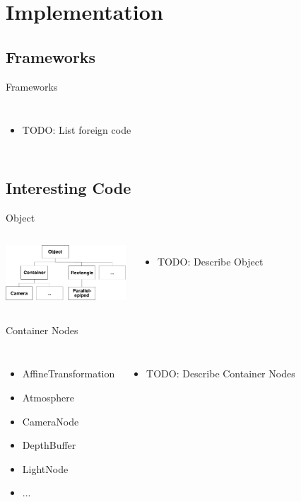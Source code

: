 \documentclass[12pt,ucs,hyperref={pdftext}]{beamer}
\newlength{\columnleft}
\newlength{\columnright}
\begin{document}
\section{Implementation}


\subsection{Frameworks}

\begin{frame}{Frameworks}
\begin{columns}

\column{\columnleft}

\column{\columnright}
\begin{itemize}%
\item TODO: List foreign code
\end{itemize}

\end{columns}
\end{frame}


\subsection{Interesting Code}

\begin{frame}{Object}
\begin{columns}

\column{\columnleft}
\includegraphics[width=4.5cm]{media/object.pdf}

\column{\columnright}
\begin{itemize}%
\item TODO: Describe Object
\end{itemize}

\end{columns}
\end{frame}

\begin{frame}{Container Nodes}
\begin{columns}

\column{\columnleft}
\begin{itemize}
\item AffineTransformation
\item Atmosphere
\item CameraNode
\item DepthBuffer
\item LightNode
\item ...
\end{itemize}

\column{\columnright}
\begin{itemize}%
\item TODO: Describe Container Nodes
\end{itemize}

\end{columns}
\end{frame}
\end{document}
